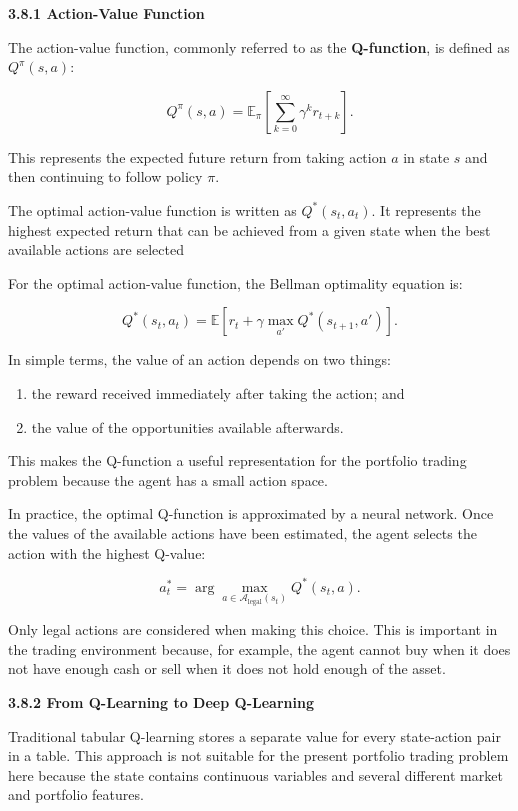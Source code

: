 \textbf{3.8.1 Action-Value Function}

The action-value function, commonly referred to as the
\textbf{Q-function}, is defined as \(Q^{\pi}(s,a)\):

\[Q^{\pi}(s,a) = \mathbb{E}_{\pi}\left\lbrack \sum_{k = 0}^{\infty}\gamma^{k}r_{t + k} \right\rbrack.\]

This represents the expected future return from taking action \(a\) in
state \(s\) and then continuing to follow policy \(\pi\).

The optimal action-value function is written as
\(Q^{*}\left( s_{t},a_{t} \right)\). It represents the highest expected
return that can be achieved from a given state when the best available
actions are selected

For the optimal action-value function, the Bellman optimality equation
is:

\[Q^{*}\left( s_{t},a_{t} \right) = \mathbb{E}\left\lbrack r_{t} + \gamma\max_{a'}{Q^{*}\left( s_{t + 1},a' \right)} \right\rbrack.\]

In simple terms, the value of an action depends on two things:

\begin{enumerate}
\def\labelenumi{\arabic{enumi}.}
\item
  the reward received immediately after taking the action; and
\item
  the value of the opportunities available afterwards.
\end{enumerate}

This makes the Q-function a useful representation for the portfolio
trading problem because the agent has a small action space.

In practice, the optimal Q-function is approximated by a neural network.
Once the values of the available actions have been estimated, the agent
selects the action with the highest Q-value:

\[a_{t}^{*} = \arg{\max_{a \in \mathcal{A}_{\text{legal}}\left( s_{t} \right)}{Q^{*}\left( s_{t},a \right)}}.\]

Only legal actions are considered when making this choice. This is
important in the trading environment because, for example, the agent
cannot buy when it does not have enough cash or sell when it does not
hold enough of the asset.

\textbf{3.8.2 From Q-Learning to Deep Q-Learning}

Traditional tabular Q-learning stores a separate value for every
state-action pair in a table. This approach is not suitable for the
present portfolio trading problem here because the state contains
continuous variables and several different market and portfolio
features.

